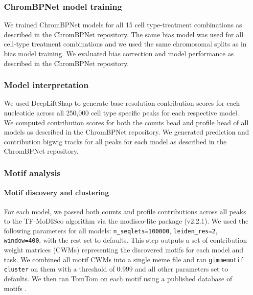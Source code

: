 \subsubsection*{ChromBPNet model training}

We trained ChromBPNet models for all 15 cell type-treatment combinations as described in the ChromBPNet repository. The same bias model was used for all cell-type treatment combinations and we used the same chromosomal splits as in bias model training. We evaluated bias correction and model performance as described in the ChromBPNet repository.

\subsubsection*{Model interpretation}

We used DeepLiftShap \cite{Shrikumar2017-og} to generate base-resolution contribution scores for each nucleotide across all 250,000 cell type specific peaks for each respective model. We computed contribution scores for both the counts head and profile head of all models as described in the ChromBPNet repository. We generated prediction and contribution bigwig tracks for all peaks for each model as described in the ChromBPNet repository.

\subsubsection*{Motif analysis}

\paragraph{Motif discovery and clustering}

For each model, we passed both counts and profile contributions across all peaks to the TF-MoDISco \cite{Shrikumar2018-sb} algorithm via the modisco-lite package (v2.2.1). We used the following parameters for all models: \texttt{n\_seqlets=100000}, \texttt{leiden\_res=2}, \texttt{window=400}, with the rest set to defaults. This step outputs a set of contribution weight matrices (CWMs) representing the discovered motifs for each model and task. We combined all motif CWMs into a single meme file and ran \texttt{gimmemotif} \cite{van-Heeringen2011-tx} \texttt{cluster} on them with a threshold of 0.999 and all other parameters set to defaults. We then ran TomTom \cite{Gupta2007-zw} on each motif using a published database of motifs \cite{Vierstra2020-te}.

